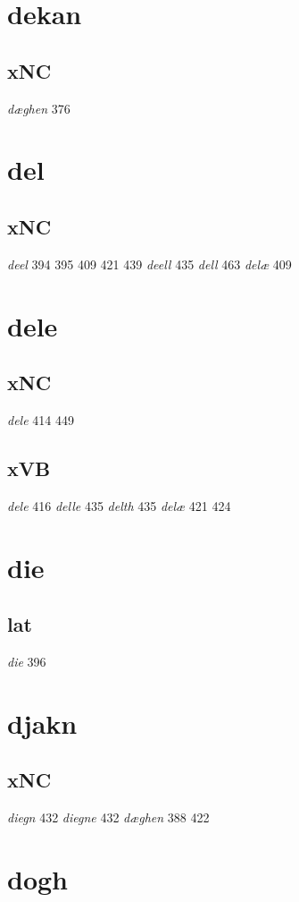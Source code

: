 \documentclass[a4paper,twocolumn]{article}
\begin{document}
\section{dekan}
\label{sec:orgec31f06}
\subsection{xNC}
\label{sec:orgfd0f110}
\emph{dæghen} 376 
\section{del}
\label{sec:org1828a27}
\subsection{xNC}
\label{sec:org7a786a3}
\emph{deel} 394 395 409 421 439 \emph{deell} 435 \emph{dell} 463 \emph{delæ} 409 
\section{dele}
\label{sec:orgfb890d1}
\subsection{xNC}
\label{sec:org0e5c2e2}
\emph{dele} 414 449 
\subsection{xVB}
\label{sec:orgb18d38a}
\emph{dele} 416 \emph{delle} 435 \emph{delth} 435 \emph{delæ} 421 424 
\section{die}
\label{sec:org51f6910}
\subsection{lat}
\label{sec:org8cdfd27}
\emph{die} 396 
\section{djakn}
\label{sec:orgba88bcb}
\subsection{xNC}
\label{sec:orgc0f33c6}
\emph{diegn} 432 \emph{diegne} 432 \emph{dæghen} 388 422 
\section{dogh}
\label{sec:orgaaab67a}
\end{document}
